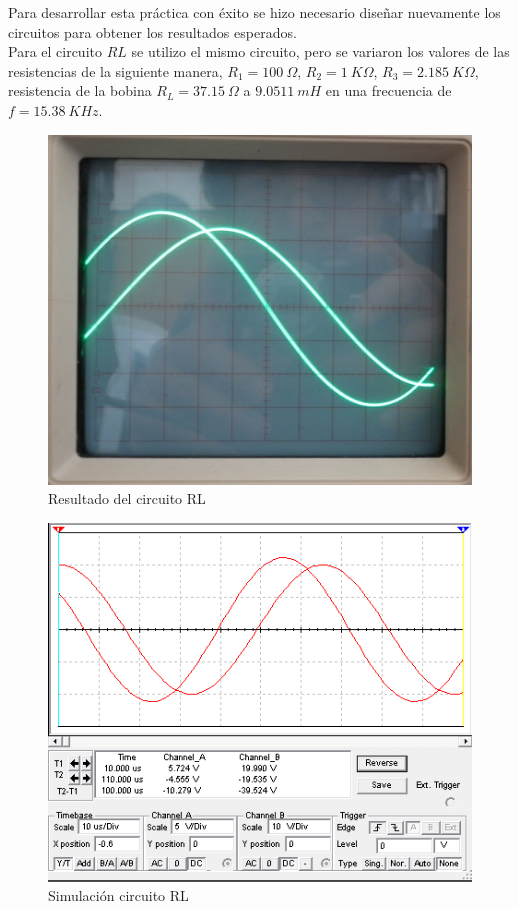 \documentclass[twocolumn]{IEEEtran}
\begin{document}
\noindent
Para desarrollar esta práctica con éxito se hizo necesario diseñar nuevamente los circuitos para obtener los resultados esperados.\\
Para el circuito $RL$ se utilizo el mismo circuito, pero se variaron los valores de las resistencias de la siguiente manera, $R_1 = 100\ \Omega$, $R_2 = 1\ K\Omega$, $R_3 = 2.185\ K\Omega$, resistencia de la bobina $R_L = 37.15\ \Omega$ a $9.0511\ mH$ en una frecuencia de $f=15.38\ KHz$.\\
\begin{figure}[H]
	\centering
		\includegraphics[scale=0.15]{232.png}
	\caption{Resultado del circuito RL}
	\label{figp1}
\end{figure}
\begin{figure}[H]
	\centering
		\includegraphics[scale=0.5]{RLsim.PNG}
	\caption{Simulación circuito RL}
	\label{fig1a}
\end{figure}
\end{document}
